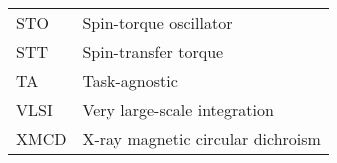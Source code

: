 {\begin{longtable}[l]{ll}
        STO   & Spin-torque oscillator                      \\
        STT   & Spin-transfer torque                        \\
        TA    & Task-agnostic                               \\
        VLSI  & Very large-scale integration                \\
        XMCD  & X-ray magnetic circular dichroism           \\
    \end{longtable}
}
